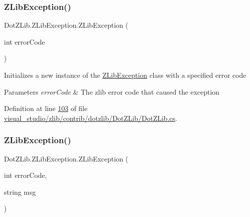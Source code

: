 \mbox{\label{class_dot_z_lib_1_1_z_lib_exception_af8dd9c725ef7bd7b2d2042e827ce9fb7}} 
\subsubsection{\texorpdfstring{Z\+Lib\+Exception()}{ZLibException()}\hspace{0.1cm}{\footnotesize\ttfamily [2/4]}}
{\footnotesize\ttfamily Dot\+Z\+Lib.\+Z\+Lib\+Exception.\+Z\+Lib\+Exception (\begin{DoxyParamCaption}\item[{int}]{error\+Code }\end{DoxyParamCaption})\hspace{0.3cm}{\ttfamily [inline]}}



Initializes a new instance of the \hyperlink{class_dot_z_lib_1_1_z_lib_exception}{Z\+Lib\+Exception} class with a specified error code 


\begin{DoxyParams}{Parameters}
{\em error\+Code} & The zlib error code that caused the exception\\
\hline
\end{DoxyParams}


Definition at line \hyperlink{visual__studio_2zlib_2contrib_2dotzlib_2_dot_z_lib_2_dot_z_lib_8cs_source_l00103}{103} of file \hyperlink{visual__studio_2zlib_2contrib_2dotzlib_2_dot_z_lib_2_dot_z_lib_8cs_source}{visual\+\_\+studio/zlib/contrib/dotzlib/\+Dot\+Z\+Lib/\+Dot\+Z\+Lib.\+cs}.

\mbox{\label{class_dot_z_lib_1_1_z_lib_exception_a6a413e419130b98ef8a443a74b2f8ded}} 
\subsubsection{\texorpdfstring{Z\+Lib\+Exception()}{ZLibException()}\hspace{0.1cm}{\footnotesize\ttfamily [3/4]}}
{\footnotesize\ttfamily Dot\+Z\+Lib.\+Z\+Lib\+Exception.\+Z\+Lib\+Exception (\begin{DoxyParamCaption}\item[{int}]{error\+Code,  }\item[{string}]{msg }\end{DoxyParamCaption})\hspace{0.3cm}{\ttfamily [inline]}}




